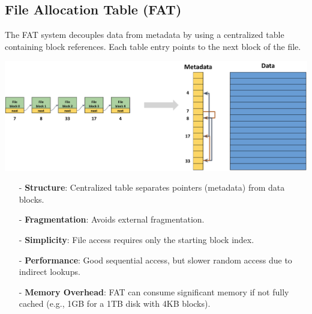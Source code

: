 \documentclass[../../compsys.tex]{subfiles}
\begin{document}
\subsection{File Allocation Table (FAT)}
The FAT system decouples data from metadata by using a centralized table containing block references. Each table entry points to the next block of the file.
\begin{center}
  \includegraphics[width=1.05\textwidth]{chapters/L6/images/fat.png}
\end{center}
\begin{itemize}[itemsep=2pt, topsep=1pt]
    \item[-] \textbf{Structure}: Centralized table separates pointers (metadata) from data blocks.
    \item[-] \textbf{Fragmentation}: Avoids external fragmentation.
    \item[-] \textbf{Simplicity}: File access requires only the starting block index.
    \item[-] \textbf{Performance}: Good sequential access, but slower random access due to indirect lookups.
    \item[-] \textbf{Memory Overhead}: FAT can consume significant memory if not fully cached (e.g., 1GB for a 1TB disk with 4KB blocks).
\end{itemize}
\end{document}

